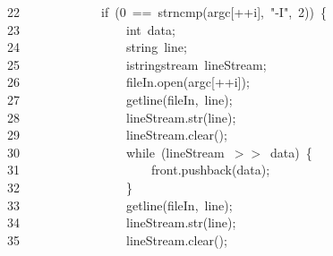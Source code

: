 \documentclass[11pt,a4paper]{ctexart}
\newcommand{\hlstd}[1]{\textcolor[rgb]{0.2,0.2,0.2}{#1}}
\newcommand{\hlnum}[1]{\textcolor[rgb]{0.06,0.58,0.63}{#1}}
\newcommand{\hlstr}[1]{\textcolor[rgb]{0.06,0.58,0.63}{#1}}
\newcommand{\hlopt}[1]{\textcolor[rgb]{0.2,0.2,0.2}{#1}}
\newcommand{\hllin}[1]{\textcolor[rgb]{0.59,0.59,0.59}{#1}}
\newcommand{\hlkwa}[1]{\textcolor[rgb]{0.23,0.42,0.78}{#1}}
\newcommand{\hlkwb}[1]{\textcolor[rgb]{0.63,0,0.31}{#1}}
\newcommand{\hlkwd}[1]{\textcolor[rgb]{0.78,0.23,0.41}{#1}}
\begin{document}
\hllin{22\ }\hlstd{}\hlstd{\ \ \ \ \ \ \ \ \ \ \ \ }\hlstd{}\hlkwa{if\ }\hlstd{}\hlopt{(}\hlstd{}\hlnum{0\ }\hlstd{}\hlopt{==\ }\hlstd{}\hlkwd{strncmp}\hlstd{}\hlopt{(}\hlstd{argc}\hlopt{{[}++}\hlstd{i}\hlopt{{]},\ }\hlstd{}\hlstr{"{-}I"}\hlstd{}\hlopt{,\ }\hlstd{}\hlnum{2}\hlstd{}\hlopt{))\ \{}\\
\hllin{23\ }\hlstd{}\hlstd{\ \ \ \ \ \ \ \ \ \ \ \ \ \ \ \ }\hlstd{}\hlkwb{int\ }\hlstd{data}\hlopt{;}\\
\hllin{24\ }\hlstd{}\hlstd{\ \ \ \ \ \ \ \ \ \ \ \ \ \ \ \ }\hlstd{string\ line}\hlopt{;}\\
\hllin{25\ }\hlstd{}\hlstd{\ \ \ \ \ \ \ \ \ \ \ \ \ \ \ \ }\hlstd{istringstream\ lineStream}\hlopt{;}\\
\hllin{26\ }\hlstd{}\hlstd{\ \ \ \ \ \ \ \ \ \ \ \ \ \ \ \ }\hlstd{fileIn}\hlopt{.}\hlstd{}\hlkwd{open}\hlstd{}\hlopt{(}\hlstd{argc}\hlopt{{[}++}\hlstd{i}\hlopt{{]});}\\
\hllin{27\ }\hlstd{}\hlstd{\ \ \ \ \ \ \ \ \ \ \ \ \ \ \ \ }\hlstd{}\hlkwd{getline}\hlstd{}\hlopt{(}\hlstd{fileIn}\hlopt{,\ }\hlstd{line}\hlopt{);}\\
\hllin{28\ }\hlstd{}\hlstd{\ \ \ \ \ \ \ \ \ \ \ \ \ \ \ \ }\hlstd{lineStream}\hlopt{.}\hlstd{}\hlkwd{str}\hlstd{}\hlopt{(}\hlstd{line}\hlopt{);}\\
\hllin{29\ }\hlstd{}\hlstd{\ \ \ \ \ \ \ \ \ \ \ \ \ \ \ \ }\hlstd{lineStream}\hlopt{.}\hlstd{}\hlkwd{clear}\hlstd{}\hlopt{();}\\
\hllin{30\ }\hlstd{}\hlstd{\ \ \ \ \ \ \ \ \ \ \ \ \ \ \ \ }\hlstd{}\hlkwa{while\ }\hlstd{}\hlopt{(}\hlstd{lineStream\ }\hlopt{$>$$>$\ }\hlstd{data}\hlopt{)\ \{}\\
\hllin{31\ }\hlstd{}\hlstd{\ \ \ \ \ \ \ \ \ \ \ \ \ \ \ \ \ \ \ \ }\hlstd{front}\hlopt{.}\hlstd{}\hlkwd{push\textunderscore back}\hlstd{}\hlopt{(}\hlstd{data}\hlopt{);}\\
\hllin{32\ }\hlstd{}\hlstd{\ \ \ \ \ \ \ \ \ \ \ \ \ \ \ \ }\hlstd{}\hlopt{\}}\\
\hllin{33\ }\hlstd{}\hlstd{\ \ \ \ \ \ \ \ \ \ \ \ \ \ \ \ }\hlstd{}\hlkwd{getline}\hlstd{}\hlopt{(}\hlstd{fileIn}\hlopt{,\ }\hlstd{line}\hlopt{);}\\
\hllin{34\ }\hlstd{}\hlstd{\ \ \ \ \ \ \ \ \ \ \ \ \ \ \ \ }\hlstd{lineStream}\hlopt{.}\hlstd{}\hlkwd{str}\hlstd{}\hlopt{(}\hlstd{line}\hlopt{);}\\
\hllin{35\ }\hlstd{}\hlstd{\ \ \ \ \ \ \ \ \ \ \ \ \ \ \ \ }\hlstd{lineStream}\hlopt{.}\hlstd{}\hlkwd{clear}\hlstd{}\hlopt{();}\\
\end{document}
